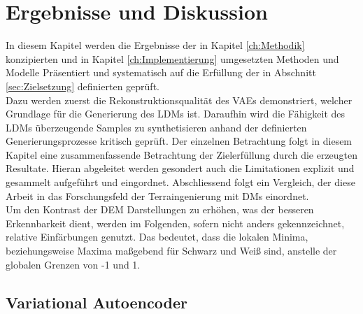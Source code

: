\chapter{Ergebnisse und Diskussion}

In diesem Kapitel werden die Ergebnisse der in Kapitel \ref{ch:Methodik} konzipierten und in Kapitel \ref{ch:Implementierung} umgesetzten Methoden und Modelle Präsentiert und systematisch auf die Erfüllung der in Abschnitt \ref{sec:Zielsetzung} definierten geprüft. \\
Dazu werden zuerst die Rekonstruktionsqualität des VAEs demonstriert, welcher Grundlage für die Generierung des LDMs ist. Daraufhin wird die Fähigkeit des LDMs überzeugende Samples zu synthetisieren anhand der definierten Generierungsprozesse kritisch geprüft. Der einzelnen Betrachtung folgt in diesem Kapitel eine zusammenfassende Betrachtung der Zielerfüllung durch die erzeugten Resultate. Hieran abgeleitet werden gesondert auch die Limitationen explizit und gesammelt aufgeführt und eingordnet. Abschliessend folgt ein Vergleich, der diese Arbeit in das Forschungsfeld der Terraingenierung mit DMs einordnet. \\
Um den Kontrast der DEM Darstellungen zu erhöhen, was der besseren Erkennbarkeit dient, werden im Folgenden, sofern nicht anders gekennzeichnet, relative Einfärbungen genutzt. Das bedeutet, dass die lokalen Minima, beziehungsweise Maxima maßgebend für Schwarz und Weiß sind, anstelle der globalen Grenzen von -1 und 1.  

\section {Variational Autoencoder}

